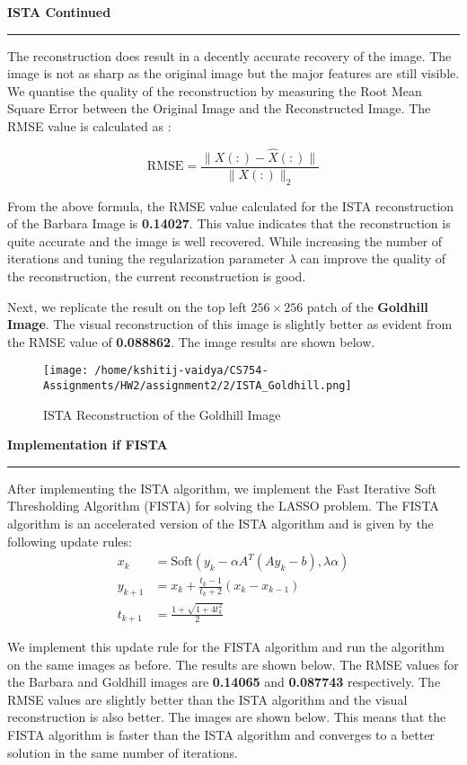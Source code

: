 \documentclass[a4paper,12pt]{article}
\newenvironment{solution}[2][]{%
    \begin{mdframed}[linecolor=blue!70!black, linewidth=2pt, roundcorner=10pt, backgroundcolor=yellow!10!white, skipabove=12pt, skipbelow=12pt]%
        \textbf{\large #2}
        \par\noindent\rule{\textwidth}{0.4pt}
}{
    \end{mdframed}
}
\begin{document}
\begin{solution}{ISTA Continued}
  The reconstruction does result in a decently accurate recovery of the image. The image is not as sharp as the original image but the major features are still visible. We quantise the quality of the reconstruction by measuring the Root Mean Square Error between the Original Image and the Reconstructed Image. The RMSE value is calculated as :

  \begin{equation}
    \text{RMSE} = \displaystyle\frac{\|X(:) - \hat{X}(:)\|}{\|X(:)\|_2}
  \end{equation}

  \noindent From the above formula, the RMSE value calculated for the ISTA reconstruction of the Barbara Image is \textbf{0.14027}. This value indicates that the reconstruction is quite accurate and the image is well recovered. While increasing the number of iterations and tuning the regularization parameter $\lambda$ can improve the quality of the reconstruction, the current reconstruction is good.

  \noindent Next, we replicate the result on the top left $256 \times 256$ patch of the \textbf{Goldhill Image}. The visual reconstruction of this image is slightly better as evident from the RMSE value of \textbf{0.088862}. The image results are shown below.
\end{solution}

\begin{figure}[!htbp]
  \centering
  \texttt{[image: /home/kshitij-vaidya/CS754-Assignments/HW2/assignment2/2/ISTA\_Goldhill.png]}
  \caption{ISTA Reconstruction of the Goldhill Image}
\end{figure}

\begin{solution}{Implementation if FISTA}
  After implementing the ISTA algorithm, we implement the Fast Iterative Soft Thresholding Algorithm (FISTA) for solving the LASSO problem. The FISTA algorithm is an accelerated version of the ISTA algorithm and is given by the following update rules:
  \begin{align}
    x_k &= \text{Soft}(y_k - \alpha A^T(Ay_k - b), \lambda \alpha) \\
    y_{k+1} &= x_k + \frac{t_k-1}{t_k+2} (x_k - x_{k-1}) \\
    t_{k+1} &= \displaystyle\frac{1 + \sqrt{1 + 4t_k^2}}{2}
  \end{align}

  \noindent We implement this update rule for the FISTA algorithm and run the algorithm on the same images as before. The results are shown below. The RMSE values for the Barbara and Goldhill images are \textbf{0.14065} and \textbf{0.087743} respectively. The RMSE values are slightly better than the ISTA algorithm and the visual reconstruction is also better. The images are shown below. This means that the FISTA algorithm is faster than the ISTA algorithm and converges to a better solution in the same number of iterations.

\end{solution}
\end{document}
